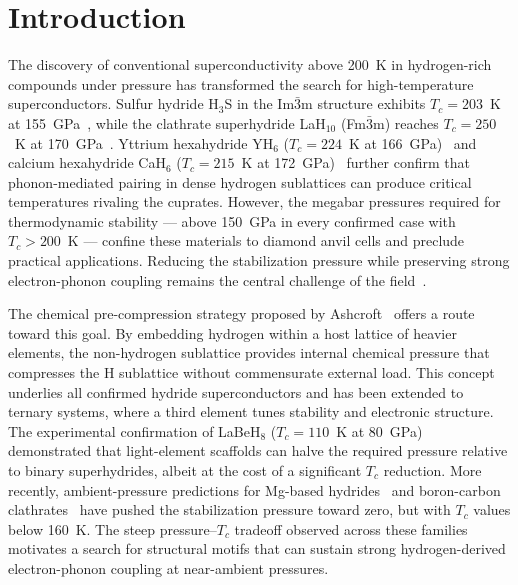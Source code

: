 \section{Introduction}
\label{sec:intro}

The discovery of conventional superconductivity above 200~K in
hydrogen-rich compounds under pressure has transformed the search for
high-temperature superconductors. Sulfur hydride H$_3$S in the
Im$\bar{3}$m structure exhibits $T_c = 203$~K at
155~GPa~\cite{Drozdov2015}, while the clathrate superhydride
LaH$_{10}$ (Fm$\bar{3}$m) reaches $T_c = 250$~K at
170~GPa~\cite{Drozdov2019,Somayazulu2019}. Yttrium hexahydride
YH$_6$ ($T_c = 224$~K at 166~GPa)~\cite{Troyan2021} and calcium
hexahydride CaH$_6$ ($T_c = 215$~K at 172~GPa)~\cite{Ma2022} further
confirm that phonon-mediated pairing in dense hydrogen sublattices can
produce critical temperatures rivaling the cuprates. However, the
megabar pressures required for thermodynamic stability --- above
150~GPa in every confirmed case with $T_c > 200$~K --- confine these
materials to diamond anvil cells and preclude practical applications.
Reducing the stabilization pressure while preserving strong
electron-phonon coupling remains the central challenge of the
field~\cite{FloresLivas2020,Boeri2022}.

The chemical pre-compression strategy proposed by
Ashcroft~\cite{Ashcroft2004} offers a route toward this goal.
By embedding hydrogen within a host lattice of heavier elements, the
non-hydrogen sublattice provides internal chemical pressure that
compresses the H sublattice without commensurate external load.
This concept underlies all confirmed hydride superconductors and has
been extended to ternary systems, where a third element tunes
stability and electronic structure. The experimental confirmation of
LaBeH$_8$ ($T_c = 110$~K at 80~GPa)~\cite{Song2023} demonstrated
that light-element scaffolds can halve the required pressure relative
to binary superhydrides, albeit at the cost of a significant $T_c$
reduction. More recently, ambient-pressure predictions for Mg-based
hydrides~\cite{Lucrezi2024} and boron-carbon
clathrates~\cite{Liang2024} have pushed the stabilization pressure
toward zero, but with $T_c$ values below 160~K. The steep
pressure--$T_c$ tradeoff observed across these families motivates a
search for structural motifs that can sustain strong hydrogen-derived
electron-phonon coupling at near-ambient pressures.

